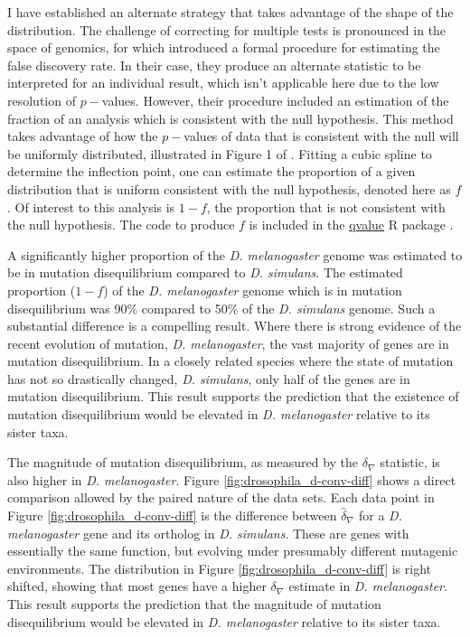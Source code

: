 I have established an alternate strategy that takes advantage of the shape of the distribution. The challenge of correcting for multiple tests is pronounced in the space of genomics, for which \cite{Storey2003StatisticalStudies} introduced a formal procedure for estimating the false discovery rate. In their case, they produce an alternate statistic to be interpreted for an individual result, which isn't applicable here due to the low resolution of $p-$values. However, their procedure included an estimation of the fraction of an analysis which is consistent with the null hypothesis. This method takes advantage of how the $p-$values of data that is consistent with the null will be uniformly distributed, illustrated in Figure 1 of \citep{Storey2003StatisticalStudies}. Fitting a cubic spline to determine the inflection point, one can estimate the proportion of a given distribution that is uniform consistent with the null hypothesis, denoted here as $f$. Of interest to this analysis is $1 - f$, the proportion that is not consistent with the null hypothesis. The code to produce $f$ is included in the \href{https://github.com/StoreyLab/qvalue}{qvalue} R package \citep{Storey2004StrongApproach}.

A significantly higher proportion of the \textit{D. melanogaster} genome was estimated to be in mutation disequilibrium compared to \textit{D. simulans}. The estimated proportion ($1 - f$) of the \textit{D. melanogaster} genome which is in mutation disequilibrium was 90\% compared to 50\% of the \textit{D. simulans} genome. Such a substantial difference is a compelling result. Where there is strong evidence of the recent evolution of mutation, \textit{D. melanogaster}, the vast majority of genes are in mutation disequilibrium. In a closely related species where the state of mutation has not so drastically changed, \textit{D. simulans}, only half of the genes are in mutation disequilibrium. This result supports the prediction that the existence of mutation disequilibrium would be elevated in \textit{D. melanogaster} relative to its sister taxa.

The magnitude of mutation disequilibrium, as measured by the $\delta_\nabla$  statistic, is also higher in \textit{D. melanogaster}. Figure \ref{fig:drosophila_d-conv-diff} shows a direct comparison allowed by the paired nature of the data sets. Each data point in Figure \ref{fig:drosophila_d-conv-diff} is the difference between $\hat \delta_\nabla$ for a \textit{D. melanogaster} gene and its ortholog in \textit{D. simulans}. These are genes with essentially the same function, but evolving under presumably different mutagenic environments. The distribution in Figure \ref{fig:drosophila_d-conv-diff} is right shifted, showing that most genes have a higher $\delta_\nabla$ estimate in \textit{D. melanogaster}. This result supports the prediction that the magnitude of mutation disequilibrium would be elevated in \textit{D. melanogaster} relative to its sister taxa. 

